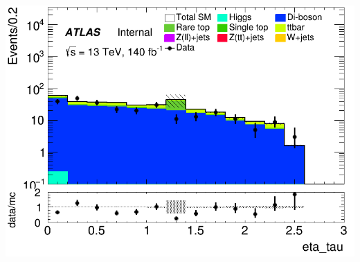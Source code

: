 \documentclass[usenames,dvipsnames]{beamer}
\begin{document}
\begin{frame}
\begin{minipage}{0.32\textwidth}
        \includegraphics[width=\textwidth]{graphics/LLL_met/LLL_met_eta_tau.png}
    \end{minipage}
\end{frame}
\end{document}
